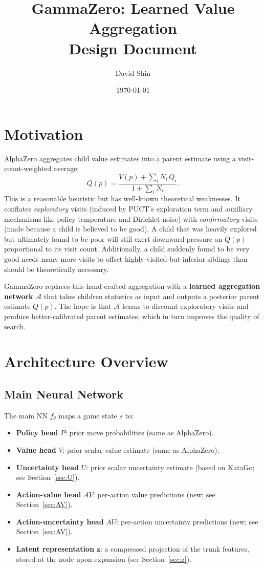 \documentclass[11pt]{article}
\title{\textbf{GammaZero: Learned Value Aggregation} \\ \large Design Document}
\author{David Shin}
\date{\today}
\begin{document}
\maketitle
\tableofcontents
\newpage

\section{Motivation}

AlphaZero aggregates child value estimates into a parent estimate using a
visit-count-weighted average:
\[
  Q(p) = \frac{V(p) + \sum_i N_i \, Q_i}{1 + \sum_i N_i}.
\]
This is a reasonable heuristic but has well-known theoretical weaknesses. It
conflates \emph{exploratory} visits (induced by PUCT's exploration term and auxiliary
mechanisms like policy temperature and Dirichlet noise) with
\emph{confirmatory} visits (made because a child is believed to be good).
A child that was heavily explored but ultimately found to be poor will still
exert downward pressure on $Q(p)$ proportional to its visit count. Additionally, a child
suddenly found to be very good needs many more visits to offset highly-visited-but-inferior
siblings than should be theoretically necessary.

GammaZero replaces this hand-crafted aggregation with a \textbf{learned
aggregation network} $\mathcal{A}$ that takes children statistics as input and
outputs a posterior parent estimate $Q(p)$. The hope is that
$\mathcal{A}$ learns to discount exploratory visits and produce better-calibrated
parent estimates, which in turn improves the quality of search.

\section{Architecture Overview}

\subsection{Main Neural Network}

The main NN $f_\theta$ maps a game state $s$ to:
\begin{itemize}[noitemsep]
  \item \textbf{Policy head} $P$: prior move probabilities (same as AlphaZero).
  \item \textbf{Value head} $V$: prior scalar value estimate (same as AlphaZero).
  \item \textbf{Uncertainty head} $U$: prior scalar uncertainty estimate (based
        on KataGo; see Section~\ref{sec:U}).
  \item \textbf{Action-value head} $AV$: per-action value predictions (new; see
        Section~\ref{sec:AV}).
  \item \textbf{Action-uncertainty head} $AU$: per-action uncertainty predictions
        (new; see Section~\ref{sec:AV}).
  \item \textbf{Latent representation} $\mathbf{z}$: a compressed projection of
        the trunk features, stored at the node upon expansion (see
        Section~\ref{sec:z}).
\end{itemize}
\end{document}

